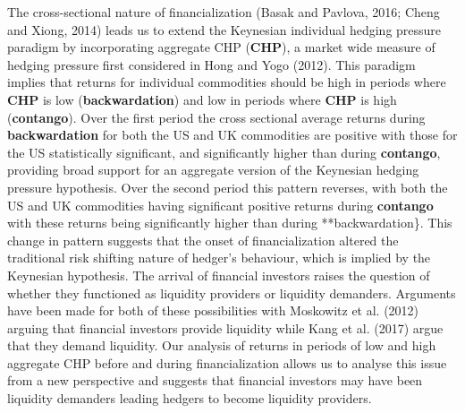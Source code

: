 \documentclass[]{elsarticle} %
\begin{document}
The cross-sectional nature of financialization (Basak and Pavlova, 2016;
Cheng and Xiong, 2014) leads us to extend the Keynesian individual
hedging pressure paradigm by incorporating aggregate CHP (\textbf{CHP}),
a market wide measure of hedging pressure first considered in Hong and
Yogo (2012). This paradigm implies that returns for individual
commodities should be high in periods where \textbf{CHP} is low
(\textbf{backwardation}) and low in periods where \textbf{CHP} is high
(\textbf{contango}). Over the first period the cross sectional average
returns during \textbf{backwardation} for both the US and UK commodities
are positive with those for the US statistically significant, and
significantly higher than during \textbf{contango}, providing broad
support for an aggregate version of the Keynesian hedging pressure
hypothesis. Over the second period this pattern reverses, with both the
US and UK commodities having significant positive returns during
\textbf{contango} with these returns being significantly higher than
during **backwardation\}. This change in pattern suggests that the onset
of financialization altered the traditional risk shifting nature of
hedger's behaviour, which is implied by the Keynesian hypothesis. The
arrival of financial investors raises the question of whether they
functioned as liquidity providers or liquidity demanders. Arguments have
been made for both of these possibilities with Moskowitz et al. (2012)
arguing that financial investors provide liquidity while Kang et al.
(2017) argue that they demand liquidity. Our analysis of returns in
periods of low and high aggregate CHP before and during financialization
allows us to analyse this issue from a new perspective and suggests that
financial investors may have been liquidity demanders leading hedgers to
become liquidity providers.
\end{document}
